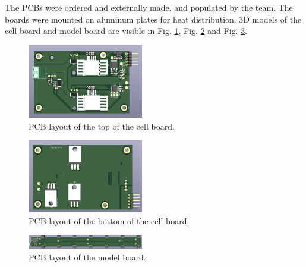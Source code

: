 The PCBs were ordered and externally made, and populated by the 
team. The boards were mounted on aluminum plates for heat 
distribution. 3D models of the cell board and model board are 
visible in Fig. \ref{fig:pcb_top_cellboard}, Fig. \ref{fig:pcb_bottom_cellboard}
and Fig. \ref{fig:pcb_modelboard}.
\FloatBarrier
\begin{figure}[h]
    \centering
    \includegraphics[width=0.45\textwidth]{pcb_cell_board_top.png}
    \caption{PCB layout of the top of the cell board.}
    \label{fig:pcb_top_cellboard}
\end{figure}
\FloatBarrier
\begin{figure}[h]
    \centering
    \includegraphics[width=0.45\textwidth]{pcb_cell_board_bottom.png}
    \caption{PCB layout of the bottom of the cell board.}
    \label{fig:pcb_bottom_cellboard}
\end{figure}
\FloatBarrier
\begin{figure}[h]
    \centering
    \includegraphics[width=0.45\textwidth]{pcb_model_board_top.png}
    \caption{PCB layout of the model board.}
    \label{fig:pcb_modelboard}
\end{figure}
\FloatBarrier